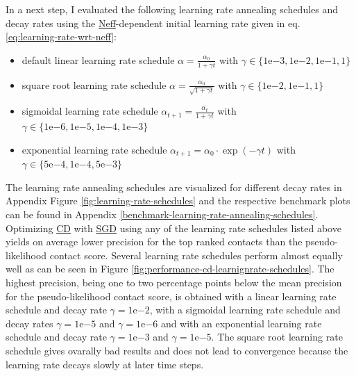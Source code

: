 \documentclass[11pt,a4paper,twoside]{book}
\providecommand{\tightlist}{%
  \setlength{\itemsep}{0pt}\setlength{\parskip}{0pt}}
\newcommand{\eq}{\!=\!}
\theoremstyle{definition}
\theoremstyle{definition}
\theoremstyle{remark}
\begin{document}
In a next step, I evaluated the following learning rate annealing
schedules and decay rates using the
\protect\hyperlink{abbrev}{Neff}-dependent initial learning rate given
in eq. \eqref{eq:learning-rate-wrt-neff}:

\begin{itemize}
\tightlist
\item
  default linear learning rate schedule
  \(\alpha = \frac{\alpha_0}{1 + \gamma t}\) with
  \(\gamma \in \{1\mathrm{e}{-3}, 1\mathrm{e}{-2}, 1\mathrm{e}{-1}, 1 \}\)
\item
  square root learning rate schedule
  \(\alpha = \frac{\alpha_0}{\sqrt{1 + \gamma t}}\) with
  \(\gamma \in \{1\mathrm{e}{-2}, 1\mathrm{e}{-1}, 1 \}\)
\item
  sigmoidal learning rate schedule
  \(\alpha_{t+1} = \frac{\alpha_{t}}{1 + \gamma t}\) with
  \(\gamma \in \{1\mathrm{e}{-6}, 1\mathrm{e}{-5}, 1\mathrm{e}{-4}, 1\mathrm{e}{-3}\}\)
\item
  exponential learning rate schedule
  \(\alpha_{t+1} = \alpha_0 \cdot\exp(- \gamma t)\) with
  \(\gamma \in \{5\mathrm{e}{-4}, 1\mathrm{e}{-4}, 5\mathrm{e}{-3}\}\)
\end{itemize}

The learning rate annealing schedules are visualized for different decay
rates in Appendix Figure \ref{fig:learning-rate-schedules} and the
respective benchmark plots can be found in Appendix
\ref{benchmark-learning-rate-annealing-schedules}. Optimizing
\protect\hyperlink{abbrev}{CD} with \protect\hyperlink{abbrev}{SGD}
using any of the learning rate schedules listed above yields on average
lower precision for the top ranked contacts than the pseudo-likelihood
contact score. Several learning rate schedules perform almost equally
well as can be seen in Figure
\ref{fig:performance-cd-learnignrate-schedules}. The highest precision,
being one to two percentage points below the mean precision for the
pseudo-likelihood contact score, is obtained with a linear learning rate
schedule and decay rate \(\gamma \eq 1\mathrm{e}{-2}\), with a sigmoidal
learning rate schedule and decay rates \(\gamma \eq 1\mathrm{e}{-5}\)
and \(\gamma \eq 1\mathrm{e}{-6}\) and with an exponential learning rate
schedule and decay rate \(\gamma \eq 1\mathrm{e}{-3}\) and
\(\gamma \eq 1\mathrm{e}{-5}\). The square root learning rate schedule
gives ovarally bad results and does not lead to convergence because the
learning rate decays slowly at later time steps.
\end{document}
